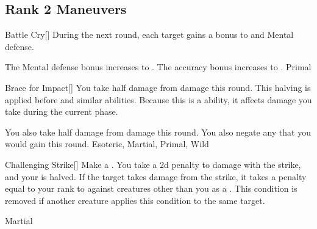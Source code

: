 \subsection{Rank 2 Maneuvers}

\lowercase{\hypertarget{maneuver:Battle Cry}{}}\label{maneuver:Battle Cry}
\hypertarget{maneuver:Battle Cry}{}
\begin{freeability}[Rank 2]{Battle Cry}[]
During the next round, each target gains a  bonus to  and Mental defense.

\rankline
{} The Mental defense bonus increases to .
 The accuracy bonus increases to .
 Primal
\end{freeability}
\vspace{0.25em}



\lowercase{\hypertarget{maneuver:Brace for Impact}{}}\label{maneuver:Brace for Impact}
\hypertarget{maneuver:Brace for Impact}{}
\begin{freeability}[Rank 2]{Brace for Impact}[]
You take half damage from  damage this round.
This halving is applied before  and similar abilities.
Because this is a  ability, it affects damage you take during the current phase.

\rankline
{} You also take half damage from  damage this round.
 You also negate any  that you would gain this round.
 Esoteric, Martial, Primal, Wild
\end{freeability}
\vspace{0.25em}



\lowercase{\hypertarget{maneuver:Challenging Strike}{}}\label{maneuver:Challenging Strike}
\hypertarget{maneuver:Challenging Strike}{}
\begin{freeability}[Rank 2]{Challenging Strike}[]
Make a .
You take a \minus2d penalty to damage with the strike, and your  is halved.
If the target takes damage from the strike, it takes a penalty equal to your rank to  against creatures other than you as a .
This condition is removed if another creature applies this condition to the same target.


 Martial
\end{freeability}
\vspace{0.25em}



